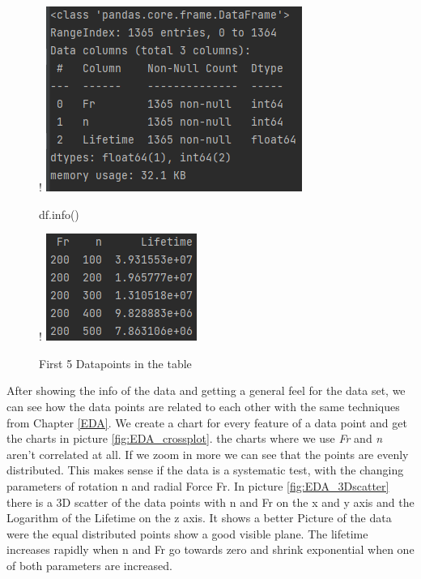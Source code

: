 \documentclass[a4paper, 12pt, oneside]{scrbook}
\begin{document}
			\begin{figure}[H]
				\centering
				\begin{minipage}[b]{0.4\textwidth}
					\resizebox{\linewidth} {!} {
						\includegraphics{res/firstEDA/df_info.png}
					}	
					\caption{df.info()}
					\label{fig:EDA_info}
				\end{minipage}
				\hfill
				\begin{minipage}[b]{0.4\textwidth}
					\resizebox{\linewidth} {!} {
						\includegraphics{res/firstEDA/df_head.png}
					}	
					\caption{First 5 Datapoints in the table}
					\label{fig:EDA_head}
				\end{minipage}
			\end{figure}
			
			\noindent After showing the info of the data and getting a general feel for the data set, we can see how the data points are related to each other with the same techniques from Chapter \ref{EDA}. We create a chart for every feature of a data point and get the charts in picture \ref{fig:EDA_crossplot}. the charts where we use \textit{Fr} and \textit{n} aren't correlated at all. If we zoom in more we can see that the points are evenly distributed. This makes sense if the data is a systematic test, with the changing parameters of rotation n and radial Force Fr. In picture \ref{fig:EDA_3Dscatter} there is a 3D scatter of the data points with n and Fr on the x and y axis and the Logarithm of the Lifetime on the z axis. It shows a better Picture of the data were the equal distributed points show a good visible plane. The lifetime increases rapidly when n and Fr go towards zero and shrink exponential when one of both parameters are increased.
	
\end{document}
